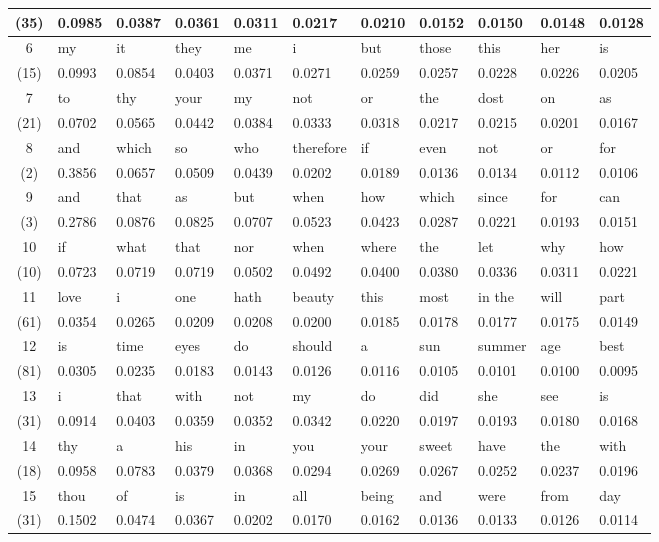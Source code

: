 \begin{table}[h!]
\begin{tabular}{c||l|l|l|l|l|l|l|l|l|l}
		(35) & 0.0985 & 0.0387 & 0.0361 & 0.0311 & 0.0217 & 0.0210 & 0.0152 & 0.0150 & 0.0148 & 0.0128 \\ \hline
		6 & my & it & they & me & i & but & those & this & her & is \\
		(15) & 0.0993 & 0.0854 & 0.0403 & 0.0371 & 0.0271 & 0.0259 & 0.0257 & 0.0228 & 0.0226 & 0.0205 \\ \hline
		7 & to & thy & your & my & not & or & the & dost & on & as \\
		(21) & 0.0702 & 0.0565 & 0.0442 & 0.0384 & 0.0333 & 0.0318 & 0.0217 & 0.0215 & 0.0201 & 0.0167 \\ \hline
		8 & and & which & so & who & therefore & if & even & not & or & for \\
		(2) & 0.3856 & 0.0657 & 0.0509 & 0.0439 & 0.0202 & 0.0189 & 0.0136 & 0.0134 & 0.0112 & 0.0106 \\ \hline
		9 & and & that & as & but & when & how & which & since & for & can \\
		(3) & 0.2786 & 0.0876 & 0.0825 & 0.0707 & 0.0523 & 0.0423 & 0.0287 & 0.0221 & 0.0193 & 0.0151 \\ \hline
		10 & if & what & that & nor & when & where & the & let & why & how \\
		(10) & 0.0723 & 0.0719 & 0.0719 & 0.0502 & 0.0492 & 0.0400 & 0.0380 & 0.0336 & 0.0311 & 0.0221 \\ \hline
		11 & love & i & one & hath & beauty & this & most & in the & will & part \\
		(61) & 0.0354 & 0.0265 & 0.0209 & 0.0208 & 0.0200 & 0.0185 & 0.0178 & 0.0177 & 0.0175 & 0.0149 \\ \hline
		12 & is & time & eyes & do & should & a & sun & summer & age & best \\
		(81) & 0.0305 & 0.0235 & 0.0183 & 0.0143 & 0.0126 & 0.0116 & 0.0105 & 0.0101 & 0.0100 & 0.0095 \\ \hline
		13 & i & that & with & not & my & do & did & she & see & is \\
		(31) & 0.0914 & 0.0403 & 0.0359 & 0.0352 & 0.0342 & 0.0220 & 0.0197 & 0.0193 & 0.0180 & 0.0168 \\ \hline
		14 & thy & a & his & in & you & your & sweet & have & the & with \\
		(18) & 0.0958 & 0.0783 & 0.0379 & 0.0368 & 0.0294 & 0.0269 & 0.0267 & 0.0252 & 0.0237 & 0.0196 \\ \hline
		15 & thou & of & is & in & all & being & and & were & from & day \\
		(31) & 0.1502 & 0.0474 & 0.0367 & 0.0202 & 0.0170 & 0.0162 & 0.0136 & 0.0133 & 0.0126 & 0.0114 \\ \hline

\end{tabular}
\end{table}
